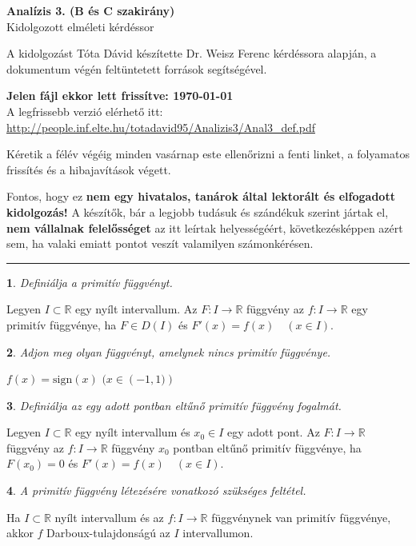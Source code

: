 \documentclass[a4paper]{article}
\def\R{\mathbb{R}}
\theoremstyle{qstyle}
\newtheorem{question}{}{}
\begin{document}
	\begin{center}
		{\Huge\textbf{Analízis 3. (B és C szakirány)}}\\
		{\Huge Kidolgozott elméleti kérdéssor}
	\end{center}
	
	A kidolgozást Tóta Dávid készítette Dr. Weisz Ferenc kérdéssora alapján, a dokumentum végén feltüntetett források segítségével. 
	
	\textbf{Jelen fájl ekkor lett frissítve: {\yyyymmdddate\today} \ \currenttime}\\
	A legfrissebb verzió elérhető itt: \url{http://people.inf.elte.hu/totadavid95/Analizis3/Anal3_def.pdf} 
	
	Kéretik a félév végéig minden vasárnap este ellenőrizni a fenti linket, a folyamatos frissítés és a hibajavítások végett.
	
	Fontos, hogy ez \textbf{nem egy hivatalos, tanárok által lektorált és elfogadott kidolgozás!} A készítők, bár a legjobb tudásuk és szándékuk szerint jártak el, \textbf{nem vállalnak felelősséget} az itt leírtak helyességéért, következésképpen azért sem, ha valaki emiatt pontot veszít valamilyen számonkérésen.

	\par\noindent\rule{\textwidth}{0.4pt}


	\begin{question}
		Definiálja a primitív függvényt.
	\end{question}
	Legyen $I \subset \R$ egy nyílt intervallum. Az $F:I\to\R$ függvény az $f:I\to\R$ egy primitív függvénye, ha $F\in D(I)$ és $F'(x)=f(x)  \quad  (x\in I)$.
	
	\begin{question}
		Adjon meg olyan függvényt, amelynek \emph{nincs} primitív függvénye.
	\end{question}
	$f(x)=\mathrm{sign}(x)$   \quad  $(x \in \left(-1,1)\right)$
	
	\begin{question}
		Definiálja az egy adott pontban eltűnő primitív függvény fogalmát.
	\end{question}
	Legyen $I \subset \R$ egy nyílt intervallum és $x_0 \in I$ egy adott pont. Az $F:I\to\R$ függvény az $f:I\to\R$ függvény $x_0$ pontban eltűnő primitív függvénye, ha $F(x_0)=0$ és $F'(x)=f(x)  \quad  (x\in I)$.
	
	\begin{question}
		A primitív függvény létezésére vonatkozó szükséges feltétel.
	\end{question}
	Ha $I \subset \R$ nyílt intervallum és az $f:I\to\R$ függvénynek van primitív függvénye, akkor $f$ Darboux-tulajdonságú az $I$ intervallumon.
	
\end{document}
